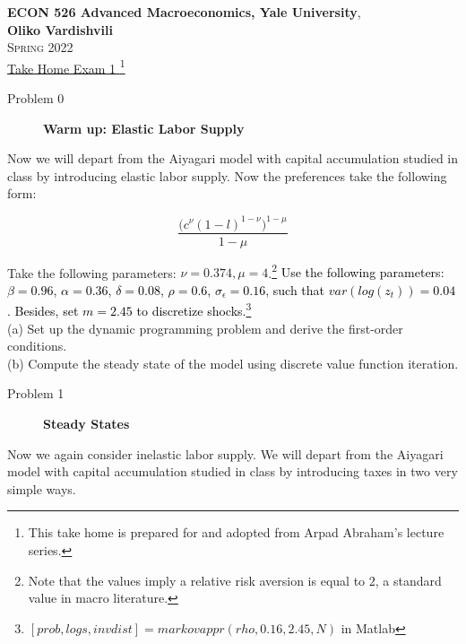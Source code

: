 \documentclass[11pt, a4paper, reqno]{article}
\begin{document}
\begin{center}


\textbf{ECON 526 Advanced Macroeconomics, Yale University}, 
\\
 \textbf{Oliko Vardishvili}\bigskip \\
\textsc{Spring 2022 } \\

\underline{{\large Take Home Exam 1 }}\footnote{This take home is prepared for and adopted from  Arpad Abraham's lecture series. } \bigskip 
\end{center}


\begin{description}
	\item[Problem 0] \textbf{Warm up:  Elastic Labor Supply} \newline
\end{description}
Now we will depart from the Aiyagari model with capital accumulation studied
in class by introducing elastic labor supply. Now the preferences take the following form:

\begin{equation}
 \dfrac{\big(c^{\nu}(1-l)^{1-{\nu}}\big)^{1-\mu}}{1-\mu}
\end{equation}


Take the following parameters: $\nu =0.374, \mu=4$.\footnote{Note that the values imply a relative risk aversion is equal to $2$, a standard value in macro literature. }
\textcolor{black}{ Use the following parameters:  $\beta=0.96$, $\alpha=0.36$, $\delta=0.08$, $\rho=0.6$, $\sigma_{\epsilon}=0.16$, such that $var(log(z_t))=0.04$. Besides, set $m=2.45$ to discretize shocks.}\footnote{$[prob,logs,invdist]=markovappr(rho,0.16,2.45,N)$ in Matlab}\\ 



(a) Set up the dynamic programming problem and derive  the first-order conditions.\\ %
(b) Compute the steady state of the model using discrete value function iteration.\\ 


\begin{description}
\item[Problem 1] \textbf{Steady States} \newline
\end{description}
Now we again consider inelastic labor supply. We will depart from the Aiyagari model with capital accumulation studied
in class by introducing taxes in two very simple ways.
\end{document}
